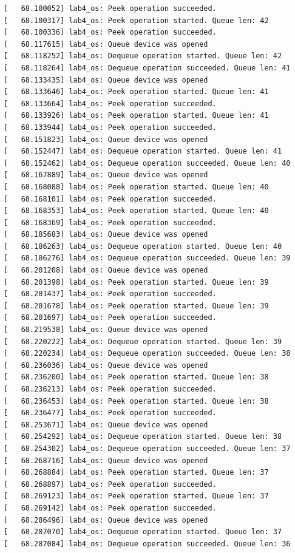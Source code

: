 \documentclass[a4paper,14pt]{extarticle}
\begin{document}
\begin{verbatim}
[   68.100052] lab4_os: Peek operation succeeded.
[   68.100317] lab4_os: Peek operation started. Queue len: 42
[   68.100336] lab4_os: Peek operation succeeded.
[   68.117615] lab4_os: Queue device was opened
[   68.118252] lab4_os: Dequeue operation started. Queue len: 42
[   68.118264] lab4_os: Dequeue operation succeeded. Queue len: 41
[   68.133435] lab4_os: Queue device was opened
[   68.133646] lab4_os: Peek operation started. Queue len: 41
[   68.133664] lab4_os: Peek operation succeeded.
[   68.133926] lab4_os: Peek operation started. Queue len: 41
[   68.133944] lab4_os: Peek operation succeeded.
[   68.151823] lab4_os: Queue device was opened
[   68.152447] lab4_os: Dequeue operation started. Queue len: 41
[   68.152462] lab4_os: Dequeue operation succeeded. Queue len: 40
[   68.167889] lab4_os: Queue device was opened
[   68.168088] lab4_os: Peek operation started. Queue len: 40
[   68.168101] lab4_os: Peek operation succeeded.
[   68.168353] lab4_os: Peek operation started. Queue len: 40
[   68.168369] lab4_os: Peek operation succeeded.
[   68.185683] lab4_os: Queue device was opened
[   68.186263] lab4_os: Dequeue operation started. Queue len: 40
[   68.186276] lab4_os: Dequeue operation succeeded. Queue len: 39
[   68.201208] lab4_os: Queue device was opened
[   68.201398] lab4_os: Peek operation started. Queue len: 39
[   68.201437] lab4_os: Peek operation succeeded.
[   68.201678] lab4_os: Peek operation started. Queue len: 39
[   68.201697] lab4_os: Peek operation succeeded.
[   68.219538] lab4_os: Queue device was opened
[   68.220222] lab4_os: Dequeue operation started. Queue len: 39
[   68.220234] lab4_os: Dequeue operation succeeded. Queue len: 38
[   68.236036] lab4_os: Queue device was opened
[   68.236200] lab4_os: Peek operation started. Queue len: 38
[   68.236213] lab4_os: Peek operation succeeded.
[   68.236453] lab4_os: Peek operation started. Queue len: 38
[   68.236477] lab4_os: Peek operation succeeded.
[   68.253671] lab4_os: Queue device was opened
[   68.254292] lab4_os: Dequeue operation started. Queue len: 38
[   68.254302] lab4_os: Dequeue operation succeeded. Queue len: 37
[   68.268716] lab4_os: Queue device was opened
[   68.268884] lab4_os: Peek operation started. Queue len: 37
[   68.268897] lab4_os: Peek operation succeeded.
[   68.269123] lab4_os: Peek operation started. Queue len: 37
[   68.269142] lab4_os: Peek operation succeeded.
[   68.286496] lab4_os: Queue device was opened
[   68.287070] lab4_os: Dequeue operation started. Queue len: 37
[   68.287084] lab4_os: Dequeue operation succeeded. Queue len: 36

\end{verbatim}
\end{document}
